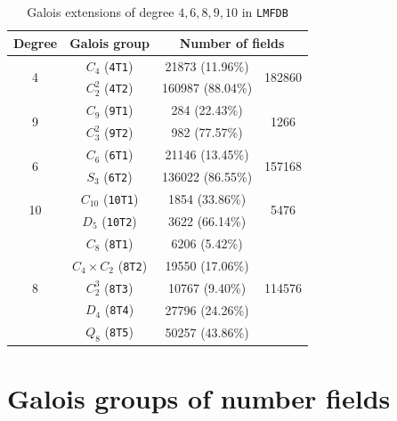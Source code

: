 \documentclass[letterpaper, 10pt]{article}
\newcommand{\1}{\mathds{1}}	%
\theoremstyle{definition}
\theoremstyle{remark}
\begin{document}
\begin{table}[h]
    \begin{center}
        \begin{tabular}{c|c|c|c}
            \toprule
            Degree & Galois group & \multicolumn{2}{c}{Number of fields} \\
            \midrule
            \multirow{2}{*}{4} & $C_4$ (\texttt{4T1}) & 21873 (11.96\%) & \multirow{2}{*}{182860} \\
            & $C_2^2$ (\texttt{4T2}) & 160987 (88.04\%) \\
            \midrule
            \multirow{2}{*}{9} & $C_9$ (\texttt{9T1}) & 284 (22.43\%) & \multirow{2}{*}{1266} \\
            & $C_3^2$ (\texttt{9T2}) & 982 (77.57\%) \\
            \midrule
            \midrule
            \multirow{2}{*}{6} & $C_6$ (\texttt{6T1}) & 21146 (13.45\%) & \multirow{2}{*}{157168} \\
            & $S_3$ (\texttt{6T2}) & 136022 (86.55\%) \\
            \midrule
            \multirow{2}{*}{10} & $C_{10}$ (\texttt{10T1}) & 1854 (33.86\%) & \multirow{2}{*}{5476} \\
            & $D_5$ (\texttt{10T2}) & 3622 (66.14\%) \\
            \midrule
            \midrule
            \multirow{5}{*}{8} & $C_8$ (\texttt{8T1}) & 6206 (5.42\%) & \multirow{5}{*}{114576} \\
            & $C_4 \times C_2$ (\texttt{8T2}) & 19550 (17.06\%) \\
            & $C_2^3$ (\texttt{8T3}) & 10767 (9.40\%) \\
            & $D_4$ (\texttt{8T4}) & 27796 (24.26\%) \\
            & $Q_8$ (\texttt{8T5}) & 50257 (43.86\%) \\
            \bottomrule
        \end{tabular}
        \caption{Galois extensions of degree $4, 6, 8, 9, 10$ in \texttt{LMFDB} \cite{lmfdb}}
        \label{tab:nf_count_galois}
    \end{center}
\end{table}



\section{Galois groups of number fields}
\label{sec:galois}
\end{document}

